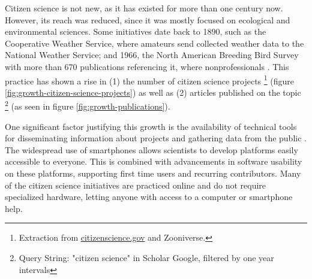 
Citizen science is not new, as it has existed for more than one century now. However, its reach was reduced, since it was mostly focused on ecological and environmental sciences. Some initiatives date back to 1890, such as the Cooperative Weather Service, where amateurs send collected weather data to the National Weather Service; and 1966, the North American Breeding Bird Survey with more than 670 publications referencing it, where nonprofessionals   . This practice has shown a rise in (1) the number of citizen science projects \footnote{Extraction from \href{citizenscience.gov}{citizenscience.gov} and Zooniverse.} (figure \ref{fig:growth-citizen-science-projects}) as well as (2) articles published on the topic \footnote{Query String: "citizen science" in Scholar Google, filtered by one year intervals} (as seen in figure \ref{fig:growth-publications}).

One significant factor justifying this growth is the availability of technical tools for disseminating information about projects and gathering data from the public \cite{silvertown2009new}. The widespread use of smartphones allows scientists to develop platforms easily accessible to everyone. This is combined with advancements in software usability on these platforms, supporting first time users and recurring contributors. Many of the citizen science initiatives are practiced online and do not require specialized hardware, letting anyone with access to a computer or smartphone help.


\publicationdata


